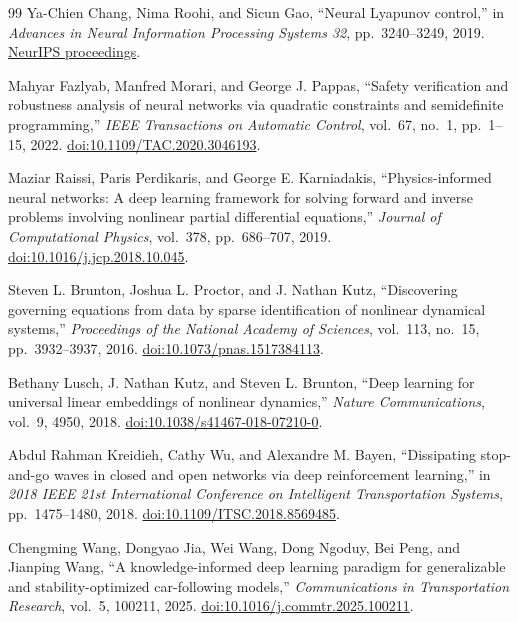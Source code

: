 \documentclass[11pt,a4paper,openany]{book}
\numberwithin{equation}{chapter}
\numberwithin{figure}{chapter}
\numberwithin{table}{chapter}
\begin{document}
\begin{thebibliography}{99}
Ya-Chien Chang, Nima Roohi, and Sicun Gao,
``Neural Lyapunov control,''
in \emph{Advances in Neural Information Processing Systems 32}, pp.~3240--3249, 2019.
\href{https://proceedings.neurips.cc/paper/2019/hash/2647c1dba23bc0e0f9cdf75339e120d2-Abstract.html}{NeurIPS proceedings}.

Mahyar Fazlyab, Manfred Morari, and George J. Pappas,
``Safety verification and robustness analysis of neural networks via quadratic constraints and semidefinite programming,''
\emph{IEEE Transactions on Automatic Control}, vol.~67, no.~1, pp.~1--15, 2022.
\href{https://doi.org/10.1109/TAC.2020.3046193}{doi:10.1109/TAC.2020.3046193}.

Maziar Raissi, Paris Perdikaris, and George E. Karniadakis,
``Physics-informed neural networks: A deep learning framework for solving forward and inverse problems involving nonlinear partial differential equations,''
\emph{Journal of Computational Physics}, vol.~378, pp.~686--707, 2019.
\href{https://doi.org/10.1016/j.jcp.2018.10.045}{doi:10.1016/j.jcp.2018.10.045}.

Steven L. Brunton, Joshua L. Proctor, and J. Nathan Kutz,
``Discovering governing equations from data by sparse identification of nonlinear dynamical systems,''
\emph{Proceedings of the National Academy of Sciences}, vol.~113, no.~15, pp.~3932--3937, 2016.
\href{https://doi.org/10.1073/pnas.1517384113}{doi:10.1073/pnas.1517384113}.

Bethany Lusch, J. Nathan Kutz, and Steven L. Brunton,
``Deep learning for universal linear embeddings of nonlinear dynamics,''
\emph{Nature Communications}, vol.~9, 4950, 2018.
\href{https://doi.org/10.1038/s41467-018-07210-0}{doi:10.1038/s41467-018-07210-0}.

Abdul Rahman Kreidieh, Cathy Wu, and Alexandre M. Bayen,
``Dissipating stop-and-go waves in closed and open networks via deep reinforcement learning,''
in \emph{2018 IEEE 21st International Conference on Intelligent Transportation Systems}, pp.~1475--1480, 2018.
\href{https://doi.org/10.1109/ITSC.2018.8569485}{doi:10.1109/ITSC.2018.8569485}.

Chengming Wang, Dongyao Jia, Wei Wang, Dong Ngoduy, Bei Peng, and Jianping Wang,
``A knowledge-informed deep learning paradigm for generalizable and stability-optimized car-following models,''
\emph{Communications in Transportation Research}, vol.~5, 100211, 2025.
\href{https://doi.org/10.1016/j.commtr.2025.100211}{doi:10.1016/j.commtr.2025.100211}.
\end{thebibliography}
\end{document}
